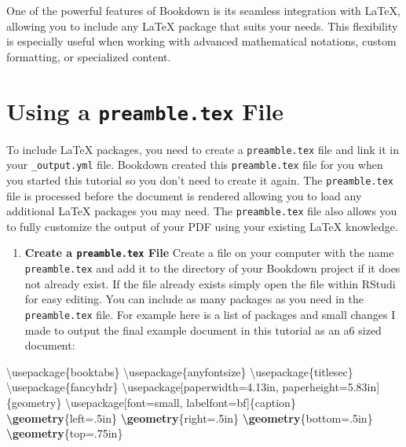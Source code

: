 \documentclass[
]{book}
\newenvironment{Shaded}{\begin{snugshade}}{\end{snugshade}}
\newcommand{\BuiltInTok}[1]{#1}
\newcommand{\ExtensionTok}[1]{#1}
\newcommand{\FunctionTok}[1]{\textcolor[rgb]{0.13,0.29,0.53}{\textbf{#1}}}
\newcommand{\NormalTok}[1]{#1}
\providecommand{\tightlist}{%
  \setlength{\itemsep}{0pt}\setlength{\parskip}{0pt}}
\theoremstyle{definition}
\theoremstyle{definition}
\theoremstyle{definition}
\theoremstyle{definition}
\theoremstyle{remark}
\begin{document}
One of the powerful features of Bookdown is its seamless integration with LaTeX, allowing you to include any LaTeX package that suits your needs. This flexibility is especially useful when working with advanced mathematical notations, custom formatting, or specialized content.

\section{\texorpdfstring{Using a \texttt{preamble.tex} File}{Using a preamble.tex File}}\label{using-a-preamble.tex-file}

To include LaTeX packages, you need to create a \texttt{preamble.tex} file and link it in your \texttt{\_output.yml} file. Bookdown created this \texttt{preamble.tex} file for you when you started this tutorial so you don't need to create it again. The \texttt{preamble.tex} file is processed before the document is rendered allowing you to load any additional LaTeX packages you may need. The \texttt{preamble.tex} file also allows you to fully customize the output of your PDF using your existing LaTeX knowledge.

\begin{enumerate}
\def\labelenumi{\arabic{enumi}.}
\tightlist
\item
  \textbf{Create a \texttt{preamble.tex} File}
  Create a file on your computer with the name \texttt{preamble.tex} and add it to the directory of your Bookdown project if it does not already exist. If the file already exists simply open the file within RStudi for easy editing. You can include as many packages as you need in the \texttt{preamble.tex} file. For example here is a list of packages and small changes I made to output the final example document in this tutorial as an a6 sized document:
\end{enumerate}

\begin{Shaded}
\begin{Highlighting}[]
\BuiltInTok{\textbackslash{}usepackage}\NormalTok{\{}\ExtensionTok{booktabs}\NormalTok{\}}
\BuiltInTok{\textbackslash{}usepackage}\NormalTok{\{}\ExtensionTok{anyfontsize}\NormalTok{\}}
\BuiltInTok{\textbackslash{}usepackage}\NormalTok{\{}\ExtensionTok{titlesec}\NormalTok{\}}
\BuiltInTok{\textbackslash{}usepackage}\NormalTok{\{}\ExtensionTok{fancyhdr}\NormalTok{\}}
\BuiltInTok{\textbackslash{}usepackage}\NormalTok{[paperwidth=4.13in, paperheight=5.83in]\{}\ExtensionTok{geometry}\NormalTok{\}}
\BuiltInTok{\textbackslash{}usepackage}\NormalTok{[font=small, labelfont=bf]\{}\ExtensionTok{caption}\NormalTok{\}}
\FunctionTok{\textbackslash{}geometry}\NormalTok{\{left=.5in\}}
\FunctionTok{\textbackslash{}geometry}\NormalTok{\{right=.5in\}}
\FunctionTok{\textbackslash{}geometry}\NormalTok{\{bottom=.5in\}}
\FunctionTok{\textbackslash{}geometry}\NormalTok{\{top=.75in\}}
\end{Highlighting}
\end{Shaded}
\end{document}
